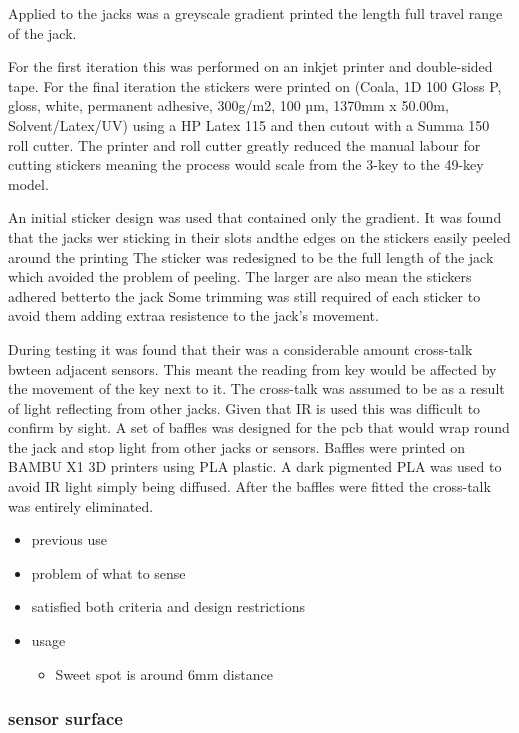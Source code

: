 Applied to the jacks was a greyscale gradient printed the length full
travel range of the jack.

For the first iteration this was performed on an inkjet printer and
double-sided tape. For the final iteration the stickers were printed on
(Coala, 1D 100 Gloss P, gloss, white, permanent adhesive, 300g/m2, 100
µm, 1370mm x 50.00m, Solvent/Latex/UV) using a HP Latex 115 and then
cutout with a Summa 150 roll cutter. The printer and roll cutter greatly
reduced the manual labour for cutting stickers meaning the process would
scale from the 3-key to the 49-key model.

An initial sticker design was used that contained only the gradient. It
was found that the jacks wer sticking in their slots andthe edges on the
stickers easily peeled around the printing The sticker was redesigned to
be the full length of the jack which avoided the problem of peeling. The
larger are also mean the stickers adhered betterto the jack Some
trimming was still required of each sticker to avoid them adding extraa
resistence to the jack's movement.

During testing it was found that their was a considerable amount
cross-talk bwteen adjacent sensors. This meant the reading from key
would be affected by the movement of the key next to it. The cross-talk
was assumed to be as a result of light reflecting from other jacks.
Given that IR is used this was difficult to confirm by sight. A set of
baffles was designed for the pcb that would wrap round the jack and stop
light from other jacks or sensors. Baffles were printed on BAMBU X1 3D
printers using PLA plastic. A dark pigmented PLA was used to avoid IR
light simply being diffused. After the baffles were fitted the
cross-talk was entirely eliminated.

\begin{itemize}
\item
  previous use
\item
  problem of what to sense
\item
  satisfied both criteria and design restrictions
\item
  usage

  \begin{itemize}
  \item
    Sweet spot is around 6mm distance
  \end{itemize}
\end{itemize}

\subsubsection{sensor surface}\label{sensor-surface}

